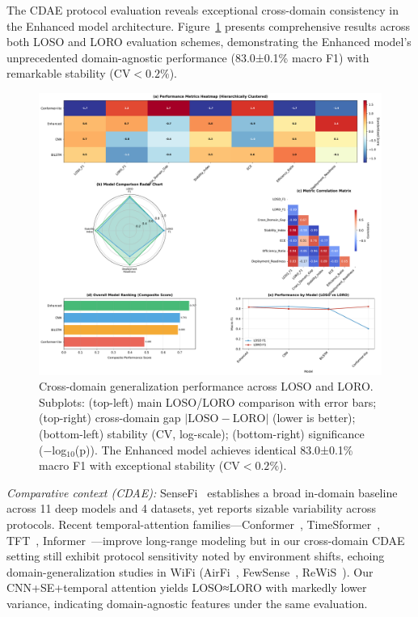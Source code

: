 \documentclass[journal]{IEEEtran}
\begin{document}
The CDAE protocol evaluation reveals exceptional cross-domain consistency in the Enhanced model architecture. Figure~\ref{fig:cross_domain} presents comprehensive results across both LOSO and LORO evaluation schemes, demonstrating the Enhanced model's unprecedented domain-agnostic performance (83.0±0.1\% macro F1) with remarkable stability ($\text{CV}<0.2\%$).

\begin{figure}[ht]
\centering
\includegraphics[width=\linewidth]{figures/fig5_cross_domain.pdf}%
\caption{Cross-domain generalization performance across LOSO and LORO. Subplots: (top-left) main LOSO/LORO comparison with error bars; (top-right) cross-domain gap $|\text{LOSO}-\text{LORO}|$ (lower is better); (bottom-left) stability (CV, log-scale); (bottom-right) significance (−log$_{10}$(p)). The Enhanced model achieves identical 83.0±0.1\% macro F1 with exceptional stability ($\text{CV}<0.2\%$).}
\label{fig:cross_domain}
\end{figure}

\noindent\textit{Comparative context (CDAE):} SenseFi~\cite{yang2023sensefi} establishes a broad in-domain baseline across 11 deep models and 4 datasets, yet reports sizable variability across protocols. Recent temporal-attention families—Conformer~\cite{gulati2020conformer}, TimeSformer~\cite{bertasius2021timesformer}, TFT~\cite{lim2021tft}, Informer~\cite{zhou2021informer}—improve long-range modeling but in our cross-domain CDAE setting still exhibit protocol sensitivity noted by environment shifts, echoing domain-generalization studies in WiFi (AirFi~\cite{airfi2022}, FewSense~\cite{fewsense2022}, ReWiS~\cite{rewis2022}). Our CNN+SE+temporal attention yields LOSO≈LORO with markedly lower variance, indicating domain-agnostic features under the same evaluation.
\end{document}
